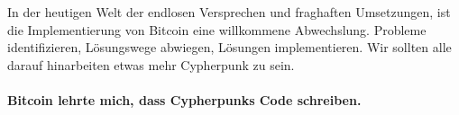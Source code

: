 \newpage

In der heutigen Welt der endlosen Versprechen und fraghaften Umsetzungen, ist die
Implementierung von Bitcoin eine willkommene Abwechslung. Probleme
identifizieren, Lösungswege abwiegen, Lösungen implementieren. Wir sollten alle
darauf hinarbeiten etwas mehr Cypherpunk zu sein.

\paragraph{Bitcoin lehrte mich, dass Cypherpunks Code schreiben.}

%
%
%
%
